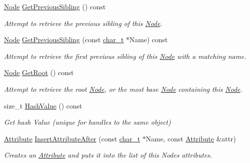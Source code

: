 \begin{DoxyCompactItemize}
\hyperlink{classMezzanine_1_1xml_1_1Node}{Node} \hyperlink{classMezzanine_1_1xml_1_1Node_a1a5a570c36e4e60b8b280be1443de3a0}{GetPreviousSibling} () const 
\begin{DoxyCompactList}\small\item\em Attempt to retrieve the previous sibling of this \hyperlink{classMezzanine_1_1xml_1_1Node}{Node}. \item\end{DoxyCompactList}\item 
\hyperlink{classMezzanine_1_1xml_1_1Node}{Node} \hyperlink{classMezzanine_1_1xml_1_1Node_a88802799304ad5ed88eeb9988fe4d8e3}{GetPreviousSibling} (const \hyperlink{namespaceMezzanine_1_1xml_a29b8a47c179e9895c4e9e66c45d1dbbc}{char\_\-t} $\ast$Name) const 
\begin{DoxyCompactList}\small\item\em Attempt to retrieve the first previous sibling of this \hyperlink{classMezzanine_1_1xml_1_1Node}{Node} with a matching name. \item\end{DoxyCompactList}\item 
\hyperlink{classMezzanine_1_1xml_1_1Node}{Node} \hyperlink{classMezzanine_1_1xml_1_1Node_a488bb0d4f42bd9718baab5c0623764cb}{GetRoot} () const 
\begin{DoxyCompactList}\small\item\em Attempt to retrieve the root \hyperlink{classMezzanine_1_1xml_1_1Node}{Node}, or the most base \hyperlink{classMezzanine_1_1xml_1_1Node}{Node} containing this \hyperlink{classMezzanine_1_1xml_1_1Node}{Node}. \item\end{DoxyCompactList}\item 
size\_\-t \hyperlink{classMezzanine_1_1xml_1_1Node_a07e6ba623fc4def9da6ca3d1d861d8e9}{HashValue} () const 
\begin{DoxyCompactList}\small\item\em Get hash Value (unique for handles to the same object) \item\end{DoxyCompactList}\item 
\hyperlink{classMezzanine_1_1xml_1_1Attribute}{Attribute} \hyperlink{classMezzanine_1_1xml_1_1Node_a7a1cfbedc5144b72d9002cdded32be43}{InsertAttributeAfter} (const \hyperlink{namespaceMezzanine_1_1xml_a29b8a47c179e9895c4e9e66c45d1dbbc}{char\_\-t} $\ast$Name, const \hyperlink{classMezzanine_1_1xml_1_1Attribute}{Attribute} \&attr)
\begin{DoxyCompactList}\small\item\em Creates an \hyperlink{classMezzanine_1_1xml_1_1Attribute}{Attribute} and puts it into the list of this Nodes attributes. \item\end{DoxyCompactList}\item 

\end{DoxyCompactItemize}
